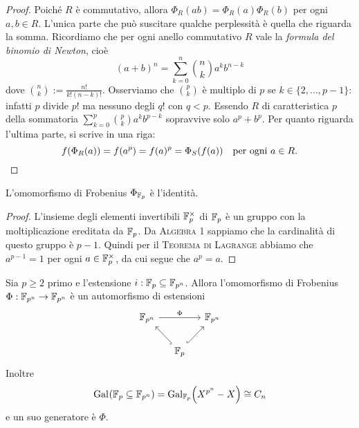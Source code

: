 \begin{proof}
Poiché \(R\) è commutativo, allora \(\Phi_R(ab) = \Phi_R(a) \Phi_R(b)\) per ogni \(a, b \in R\).  L'unica parte che può suscitare qualche perplessità è quella che riguarda la somma. Ricordiamo che per ogni anello commutativo \(R\) vale la {\em formula del binomio di Newton}, cioè 
\[(a+b)^n = \sum_{k = 0}^n \binom n k a^k b^{n-k}\]
dove \(\binom n k := \frac{n!}{k!(n-k)!}\). Osserviamo che \(\binom p k\) è multiplo di \(p\) se \(k \in \{2, \dots{}, p-1\}\): infatti \(p\) divide \(p!\) ma nessuno degli \(q!\) con \(q < p\). Essendo \(R\) di caratteristica \(p\) della sommatoria \(\sum_{k = 0}^p \binom p k a^k b^{p-k}\) sopravvive solo \(a^p + b^p\). Per quanto riguarda l'ultima parte, si scrive in una riga:
\[f(\Phi_R(a)) = f(a^p) = f(a)^p = \Phi_S(f(a)) \quad\text{per ogni } a \in R .\qedhere\]
\end{proof}

\begin{lemm}[Piccolo Teorema di Fermat]
L'omomorfismo di Frobenius \(\Phi_{\F_p}\) è l'identità.
\end{lemm}

\begin{proof}
L'insieme degli elementi invertibili \(\F_p^\times\) di \(\F_p\) è un gruppo con la moltiplicazione ereditata da \(\F_p\). Da {\scshape Algebra 1} sappiamo che la cardinalità di questo gruppo è \(p-1\). Quindi per il {\scshape Teorema di Lagrange} abbiamo che \(a^{p-1} = 1\) per ogni \(a \in \F_p^\times\), da cui segue che \(a^p = a\). 
\end{proof}

\begin{prop}\label{prop:GalEstensioniDiFp}
Sia \(p \ge 2\) primo e l'estensione \(i : \F_p \subseteq \F_{p^n}\). Allora l'omomorfismo di Frobenius \(\Phi : \F_{p^n} \to \F_{p^n}\) è un automorfismo di estensioni 
\[\begin{tikzcd}[column sep=small]
\F_{p^n} \ar["{\Phi}", rr] && \F_{p^n} \\
& \F_p \ar[hookrightarrow, ul] \ar[hookrightarrow, ur]
\end{tikzcd}\]
Inoltre 
\[\Gal{\F_p \subseteq \F_{p^n}} = \Gal[\F_p]{X^{p^n}-X} \iso C_n\]
e un suo generatore è \(\Phi\).
\end{prop}


